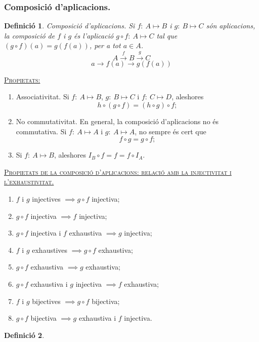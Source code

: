 \documentclass[11pt]{article}
\newcommand{\propietats}{\underline{{\scshape Propietats:}}}
\newtheorem{defi}{Definició}[section]
\begin{document}
\subsubsection{Composició d'aplicacions.}
\begin{defi}Composició d'aplicacions. Si $f:\ A\mapsto B$ i $g:\ B\mapsto C$ són aplicacions, la composició de $f$ i $g$ és l’aplicació $g\circ f:\ A \mapsto C$ tal que $(g\circ f)(a)=g(f(a))$, per a tot $a\in A$.$$A\xrightarrow{f}B\xrightarrow{g}C$$ $$a\rightarrow f(a)\rightarrow g(f(a))$$\end{defi}
\noindent\propietats
\begin{enumerate}
	\item Associativitat. Si $f:\ A\mapsto B$, $g:\ B\mapsto C$ i $f:\ C\mapsto D$, aleshores
	$$h\circ(g\circ f)=(h\circ g)\circ f;$$
	\item No commutativitat. En general, la composició d'aplicacions no és commutativa. Si $f:\ A\mapsto A$ i $g:\ A\mapsto A$, no sempre és cert que
	$$f\circ g=g\circ f;$$
	\item Si $f:\ A\mapsto B$, aleshores $I_B\circ f=f=f\circ I_A.$
\end{enumerate}
\underline{{\scshape Propietats de la composició d'aplicacions: relació amb la injectivitat i l'exhaustivitat.}}
\begin{enumerate}
	\item $f$ i $g$ injectives $\implies g\circ f$ injectiva;
	\item $g\circ f$ injectiva $\implies f$ injectiva;
	\item $g\circ f$ injectiva i $f$ exhaustiva $\implies g$ injectiva;
	\item $f$ i $g$ exhaustives $\implies g\circ f$ exhaustiva;
	\item $g\circ f$ exhaustiva $\implies g$ exhaustiva;
	\item $g\circ f$ exhaustiva i $g$ injectiva $\implies f$ exhaustiva;
	\item $f$ i $g$ bijectives $\implies g\circ f$ bijectiva;
	\item $g\circ f$ bijectiva $\implies g$ exhaustiva i $f$ injectiva.
\end{enumerate}
\begin{defi}
	
\end{defi}

\newpage
\end{document}

